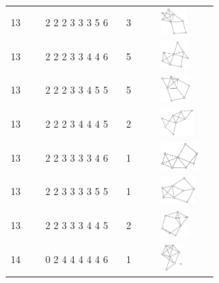 \begin{table}[h!]
\begin{tabular}{m{0.15\linewidth} m{0.35\linewidth} m{0.15\linewidth} m{0.25\linewidth}}
13 & 2 2 2 3 3 3 5 6 & 3 & \includegraphics[height=1cm]{15-universal-graphs/img/degree-sequences-example-graphs/graph-4-8-55}\\
13 & 2 2 2 3 3 4 4 6 & 5 & \includegraphics[height=1cm]{15-universal-graphs/img/degree-sequences-example-graphs/graph-4-8-56}\\
13 & 2 2 2 3 3 4 5 5 & 5 & \includegraphics[height=1cm]{15-universal-graphs/img/degree-sequences-example-graphs/graph-4-8-57}\\
13 & 2 2 2 3 4 4 4 5 & 2 & \includegraphics[height=1cm]{15-universal-graphs/img/degree-sequences-example-graphs/graph-4-8-58}\\
13 & 2 2 3 3 3 3 4 6 & 1 & \includegraphics[height=1cm]{15-universal-graphs/img/degree-sequences-example-graphs/graph-4-8-59}\\
13 & 2 2 3 3 3 3 5 5 & 1 & \includegraphics[height=1cm]{15-universal-graphs/img/degree-sequences-example-graphs/graph-4-8-60}\\
13 & 2 2 3 3 3 4 4 5 & 2 & \includegraphics[height=1cm]{15-universal-graphs/img/degree-sequences-example-graphs/graph-4-8-61}\\
14 & 0 2 4 4 4 4 4 6 & 1 & \includegraphics[height=1cm]{15-universal-graphs/img/degree-sequences-example-graphs/graph-4-8-62}\\

\end{tabular}
\end{table}

